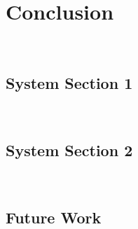%
\chapter{Conclusion}
~\label{sec:conclusion}



\section{System Section 1}
~\label{sec:conclusion:sec1}



\section{System Section 2}
~\label{sec:conclusion:sec2}



\section{Future Work}
~\label{sec:conclusion:future}


